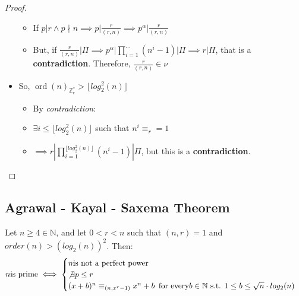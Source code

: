 \begin{proof}
\begin{itemize}
\begin{itemize}
            \item If $p | r \land p \nmid n \implies p | \frac{r}{(r,n)} \implies p^{\alpha} | \frac{r}{(r,n)}$
            \item But, if $\frac{r}{(r,n)} | \Pi \implies p^{\alpha} | \prod_{i=1}^{\dots} (n^{i} - 1) | \Pi \implies r | \Pi$, that is a \textbf{contradiction}. Therefore, $\frac{r}{(r,n)} \in \nu$
        \end{itemize}
        \item So, $\operatorname{ord}(n)_{\mathbb{Z}_{r}^{*}} > \lfloor log_{2}^{2}(n) \rfloor$
        \begin{itemize}
            \item By \emph{contradiction}:
            \item $\exists i \leq \lfloor log_{2}^{2}(n) \rfloor$ such that $n^{i} \equiv_{r} = 1$
            \item $\implies r | \prod_{i = 1}^{\lfloor log_{2}^{2}(n) \rfloor}(n^{i} - 1) | \Pi$, but this is a \textbf{contradiction}.
        \end{itemize}

    \end{itemize}
\end{proof}

\subsection{Agrawal - Kayal - Saxema Theorem}
\begin{theorem}\label{aks_theorem}
    Let $n \geq 4 \in \mathbb{N}$, and let $0 < r < n$ such that $(n,r) = 1$ and $order(n) > (log_{2}(n))^{2}$. Then:
    \[
    n \text{is prime} \iff
         \begin{cases}
           n \text{is not a perfect power} \\
           \not\exists p \leq r \\
           (x + b)^{n} \equiv_{(n, x^{r} - 1)} x^{n} + b \text{\, for every} b \in \mathbb{N} \text{ s.t. } 1 \leq b \leq \sqrt{n} \cdot log_{2}(n)
         \end{cases}
    \]
\end{theorem}

